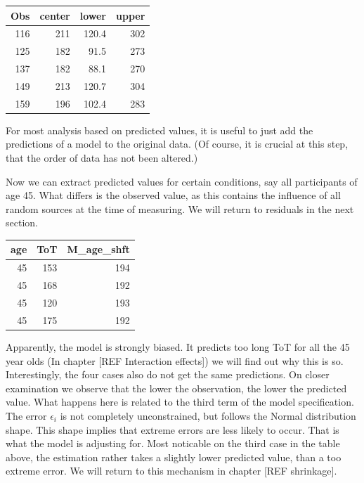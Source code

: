 \documentclass[]{svmono}
\newenvironment{Shaded}{\begin{snugshade}}{\end{snugshade}}
\newcommand{\KeywordTok}[1]{\textcolor[rgb]{0.13,0.29,0.53}{\textbf{#1}}}
\newcommand{\DataTypeTok}[1]{\textcolor[rgb]{0.13,0.29,0.53}{#1}}
\newcommand{\DecValTok}[1]{\textcolor[rgb]{0.00,0.00,0.81}{#1}}
\newcommand{\StringTok}[1]{\textcolor[rgb]{0.31,0.60,0.02}{#1}}
\newcommand{\OperatorTok}[1]{\textcolor[rgb]{0.81,0.36,0.00}{\textbf{#1}}}
\newcommand{\NormalTok}[1]{#1}
\begin{document}
\begin{longtable}[]{@{}rrrr@{}}
\toprule
Obs & center & lower & upper\tabularnewline
\midrule
\endhead
116 & 211 & 120.4 & 302\tabularnewline
125 & 182 & 91.5 & 273\tabularnewline
137 & 182 & 88.1 & 270\tabularnewline
149 & 213 & 120.7 & 304\tabularnewline
159 & 196 & 102.4 & 283\tabularnewline
\bottomrule
\end{longtable}

For most analysis based on predicted values, it is useful to just add
the predictions of a model to the original data. (Of course, it is
crucial at this step, that the order of data has not been altered.)

\begin{Shaded}
\end{Shaded}

Now we can extract predicted values for certain conditions, say all
participants of age 45. What differs is the observed value, as this
contains the influence of all random sources at the time of measuring.
We will return to residuals in the next section.

\begin{Shaded}
\end{Shaded}

\begin{tabular}{r|r|r}
\hline
age & ToT & M\_age\_shft\\
\hline
45 & 153 & 194\\
\hline
45 & 168 & 192\\
\hline
45 & 120 & 193\\
\hline
45 & 175 & 192\\
\hline
\end{tabular}

Apparently, the model is strongly biased. It predicts too long ToT for
all the 45 year olds (In chapter {[}REF Interaction effects{]}) we will
find out why this is so. Interestingly, the four cases also do not get
the same predictions. On closer examination we observe that the lower
the observation, the lower the predicted value. What happens here is
related to the third term of the model specification. The error
\(\epsilon_i\) is not completely unconstrained, but follows the Normal
distribution shape. This shape implies that extreme errors are less
likely to occur. That is what the model is adjusting for. Most noticable
on the third case in the table above, the estimation rather takes a
slightly lower predicted value, than a too extreme error. We will return
to this mechanism in chapter {[}REF shrinkage{]}.
\end{document}
